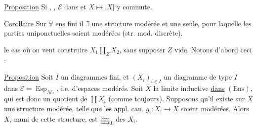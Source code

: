 \uline{Proposition} Si , ,  $\mathcal E$
 dans 
  et $X\mapsto|X|$ y commute.

\uline{Corollaire} Sur $\forall$ ens fini il $\exists$ une structure modérée et une seule, pour laquelle les parties uniponctuelles soient modérées (str. mod. discrète).

 le cas où on veut construire $X_1\amalg_Z X_2$, sans supposer $Z$ vide. Notons d'abord ceci :

\uline{Proposition} Soit $I$ un   diagrammes fini, et $(X_i)_{i\in I}$ un diagramme de type $I$ dans $\mathcal E=\operatorname{Esp}_{\mathcal M_*}$, i.e. d'espaces modérés. Soit $X$ la limite inductive \uline{dans} $(\mathrm{Ens})$, qui est donc un  quotient de $\coprod X_i$ (comme toujours). Supposons qu'il existe sur $X$ une structure modérée, telle que les appl. can. $g_i:X_i\longrightarrow X$ soient modérées. Alors $X$, muni de cette structure, est  $\varinjlim_I$ des $X_i$.
